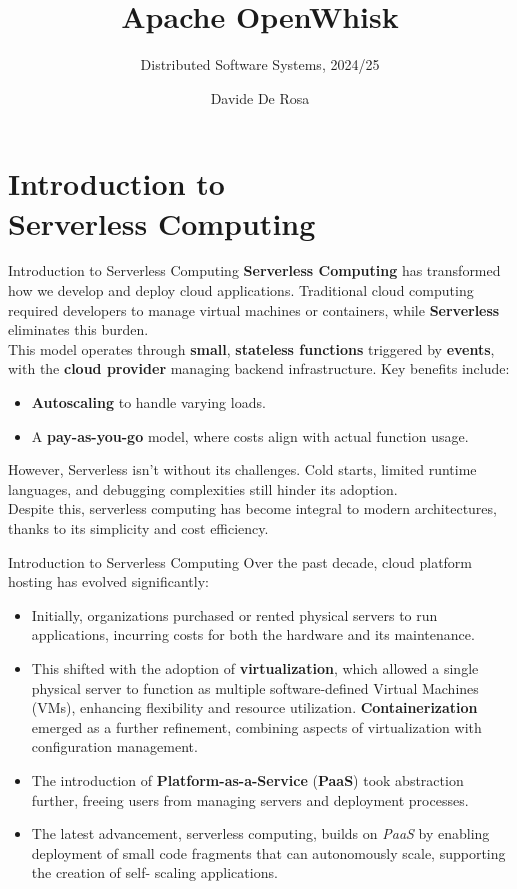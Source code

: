 \documentclass[aspectratio=169]{beamer}
\title{Apache OpenWhisk}
\subtitle{Distributed Software Systems, 2024/25}
\author{Davide De Rosa}
\date{}
\begin{document}
\begin{frame}[plain]
    \titlepage
\end{frame}

\section{Introduction to \\Serverless Computing}
\begin{frame}{Introduction to Serverless Computing}
\textbf{Serverless Computing} has transformed how we develop and deploy cloud applications. Traditional cloud computing required developers to manage virtual machines or containers, while \textbf{Serverless} eliminates this burden.\\
This model operates through \textbf{small}, \textbf{stateless functions} triggered by \textbf{events}, with the \textbf{cloud provider} managing backend infrastructure. Key benefits include:
\begin{itemize}
    \item \textbf{Autoscaling} to handle varying loads.
    \item A \textbf{pay-as-you-go} model, where costs align with actual function usage.
\end{itemize}
However, Serverless isn’t without its challenges. Cold starts, limited runtime languages, and debugging complexities still hinder its adoption.\\
Despite this, serverless computing has become integral to modern architectures, thanks to its simplicity and cost efficiency.
\end{frame}

\begin{frame}{Introduction to Serverless Computing}
Over the past decade, cloud platform hosting has evolved significantly:
\begin{itemize}
    \item Initially, organizations purchased or rented physical servers to run applications, incurring costs for both the hardware and its maintenance.
    \item This shifted with the adoption of \textbf{virtualization}, which allowed a single physical server to function as multiple software-defined Virtual Machines (VMs), enhancing flexibility and resource utilization. \textbf{Containerization} emerged as a further refinement, combining aspects of virtualization with configuration management.
    \item The introduction of \textbf{Platform-as-a-Service} (\textbf{PaaS}) took abstraction further, freeing users from managing servers and deployment processes.
    \item The latest advancement, serverless computing, builds on \textit{PaaS} by enabling deployment of small code fragments that can autonomously scale, supporting the creation of self- scaling applications.
\end{itemize}
\end{frame}
\end{document}
